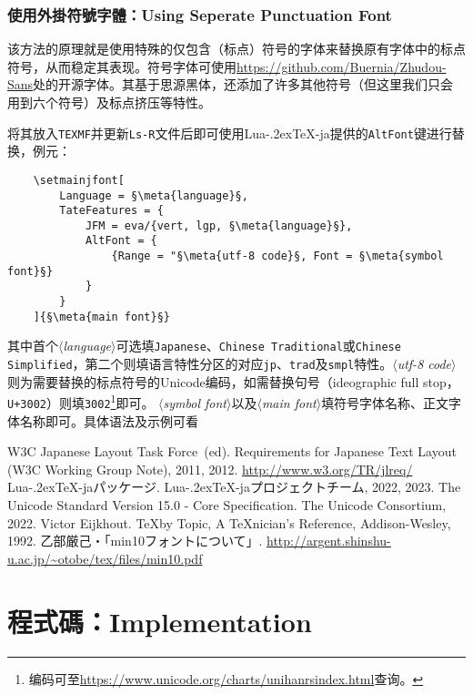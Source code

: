 \documentclass{ltjsarticle}
\def\meta#1{{\normalfont\rmfamily\itshape$\langle$#1\/$\rangle$}}
\def\段{\par}
\def\LuaTeX{Lua\kern-.2ex\TeX}
\begin{document}
\subsubsection{使用外掛符號字體：Using Seperate Punctuation Font}
该方法的原理就是使用特殊的仅包含（标点）符号的字体来替换原有字体中的标点符号，从而稳定其表现。符号字体可使用\url{https://github.com/Buernia/Zhudou-Sans}处的开源字体。其基于思源黑体，还添加了许多其他符号（但这里我们只会用到六个符号）及标点挤压等特性。\段
将其放入\texttt{TEXMF}并更新\texttt{Ls-R}文件后即可使用\LuaTeX-ja提供的\texttt{AltFont}键进行替换，例元：
\begin{lstlisting}
    \setmainjfont[
        Language = §\meta{language}§,
        TateFeatures = {
            JFM = eva/{vert, lgp, §\meta{language}§},
            AltFont = {
                {Range = "§\meta{utf-8 code}§, Font = §\meta{symbol font}§}
            }
        }
    ]{§\meta{main font}§}
\end{lstlisting}
其中首个\meta{language}可选填\texttt{Japanese}、\texttt{Chinese Traditional}或\texttt{Chinese Simplified}，第二个则填语言特性分区的对应\texttt{jp}、\texttt{trad}及\texttt{smpl}特性。\meta{utf-8 code}则为需要替换的标点符号的Unicode编码，如需替换句号（ideographic full stop，\texttt{U+3002}）则填\texttt{3002}\footnote{编码可至\url{https://www.unicode.org/charts/unihanrsindex.html}查询。}即可。
\meta{symbol font}以及\meta{main font}填符号字体名称、正文字体名称即可。具体语法及示例可看\cite{luatexja-doc}

\begin{thebibliography}{99}
     W3C Japanese Layout Task Force~(ed). \newblock Requirements for Japanese Text Layout (W3C Working Group Note), 2011, 2012. \newblock \url{http://www.w3.org/TR/jlreq/}
     \LuaTeX-jaパッケージ. \newblock \LuaTeX-jaプロジェクトチーム, 2022, 2023.
     The Unicode Standard Version 15.0 - Core Specification. \newblock The Unicode Consortium, 2022.
     Victor Eijkhout. \newblock \TeX by Topic, A \TeX nician's Reference, Addison-Wesley, 1992.
     乙部厳己・「min10フォントについて」. \newblock \url{http://argent.shinshu-u.ac.jp/~otobe/tex/files/min10.pdf}
\end{thebibliography}

\section*{程式碼：Implementation}\label{sec:impl}

\end{document}
